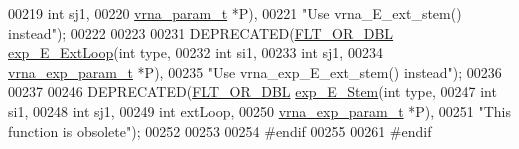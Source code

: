 \begin{DoxyCode}
00219                          \textcolor{keywordtype}{int}          sj1,
00220                          \hyperlink{group__energy__parameters_structvrna__param__s}{vrna\_param\_t} *P),
00221            \textcolor{stringliteral}{"Use vrna\_E\_ext\_stem() instead"});
00222 
00223 
00231 DEPRECATED(\hyperlink{group__data__structures_ga31125aeace516926bf7f251f759b6126}{FLT\_OR\_DBL} \hyperlink{group__loops_ga446828a191c127861e76e2c84055f672}{exp\_E\_ExtLoop}(\textcolor{keywordtype}{int}               type,
00232                                     \textcolor{keywordtype}{int}               si1,
00233                                     \textcolor{keywordtype}{int}               sj1,
00234                                     \hyperlink{group__energy__parameters_structvrna__exp__param__s}{vrna\_exp\_param\_t}  *P),
00235            \textcolor{stringliteral}{"Use vrna\_exp\_E\_ext\_stem() instead"});
00236 
00237 
00246 DEPRECATED(\hyperlink{group__data__structures_ga31125aeace516926bf7f251f759b6126}{FLT\_OR\_DBL} \hyperlink{group__loops_gab0aa9833ab41875a91a9be8a5ffd7092}{exp\_E\_Stem}(\textcolor{keywordtype}{int}              type,
00247                                  \textcolor{keywordtype}{int}              si1,
00248                                  \textcolor{keywordtype}{int}              sj1,
00249                                  \textcolor{keywordtype}{int}              extLoop,
00250                                  \hyperlink{group__energy__parameters_structvrna__exp__param__s}{vrna\_exp\_param\_t} *P),
00251            \textcolor{stringliteral}{"This function is obsolete"});
00252 
00253 
00254 \textcolor{preprocessor}{#endif}
00255 
00261 \textcolor{preprocessor}{#endif}
\end{DoxyCode}
